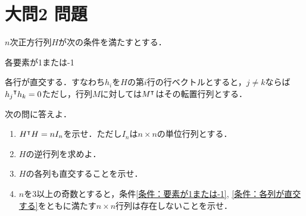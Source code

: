\documentclass[dvipdfmx]{jsreport}
\begin{document}
\section{大問2 問題}
\begin{tcolorbox} %
	$n$次正方行列$H$が次の条件を満たすとする．
\begin{enumerate_alpha}
	\item\label{条件：要素が1または-1} 各要素が1または-1
	\item\label{条件：各行が直交する} 各行が直交する．すなわち$h_i$を$H$の第$i$行の行ベクトルとすると，$j\ne k$ならば${h_j}^\intercal h_k= 0$ただし，行列$M$に対しては${M}^\intercal$はその転置行列とする．
\end{enumerate_alpha}
	次の問に答えよ．
\begin{enumerate}
	\item ${H}^\intercal H= nI_n$を示せ．ただし$I_n$は$n\times n$の単位行列とする．
	\item $H$の逆行列を求めよ．
	\item $H$の各列も直交することを示せ．
	\item $n$を3以上の奇数とすると，条件\ref{条件：要素が1または-1}, \ref{条件：各列が直交する}をともに満たす$n\times n$行列は存在しないことを示せ．
\end{enumerate}
\end{tcolorbox}
\end{document}
